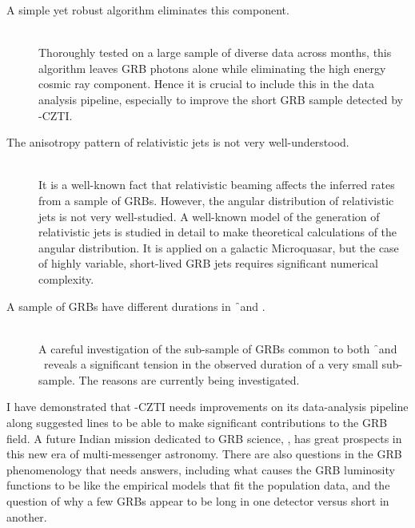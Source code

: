 \begin{description}
\item[A simple yet robust algorithm eliminates this component.] \hfill \\
Thoroughly tested on a large sample of diverse data across months, this algorithm leaves GRB photons alone while eliminating the high energy cosmic ray component. Hence it is crucial to include this in the data analysis pipeline, especially to improve the short GRB sample detected by \AS -CZTI.

\item[The anisotropy pattern of relativistic jets is not very well-understood.] \hfill \\
It is a well-known fact that relativistic beaming affects the inferred rates from a sample of GRBs. However, the angular distribution of relativistic jets is not very well-studied. A well-known model of the generation of relativistic jets is studied in detail to make theoretical calculations of the angular distribution. It is applied on a galactic Microquasar, but the case of highly variable, short-lived GRB jets requires significant numerical complexity.

\item[A sample of GRBs have different durations in \f\ and \s.] \hfill \\
A careful investigation of the sub-sample of GRBs common to both \f\ and \s\ reveals a significant tension in the observed duration of a very small sub-sample. The reasons are currently being investigated.

\end{description}


I have demonstrated that \AS -CZTI needs improvements on its data-analysis pipeline along suggested lines to be able to make significant contributions to the GRB field. A future Indian mission dedicated to GRB science, \D, has great prospects in this new era of multi-messenger astronomy. There are also questions in the GRB phenomenology that needs answers, including what causes the GRB luminosity functions to be like the empirical models that fit the population data, and the question of why a few GRBs appear to be long in one detector versus short in another.

